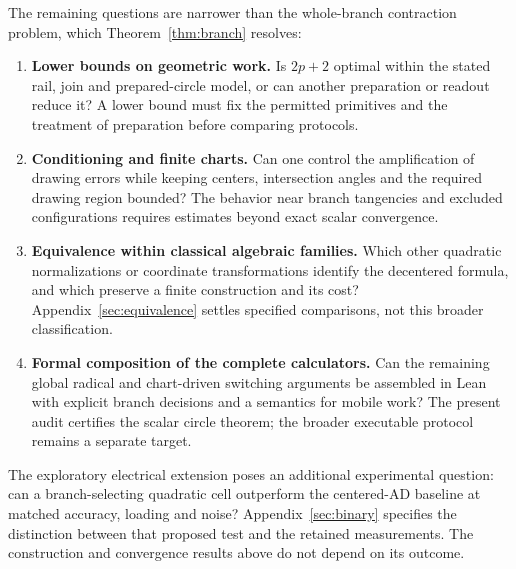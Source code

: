 \documentclass[11pt,a4paper]{article}
\begin{document}
The remaining questions are narrower than the whole-branch contraction problem, which Theorem~\ref{thm:branch} resolves:
\begin{enumerate}
\item \textbf{Lower bounds on geometric work.} Is $2p+2$ optimal within the stated rail, join and prepared-circle model, or can another preparation or readout reduce it? A lower bound must fix the permitted primitives and the treatment of preparation before comparing protocols.
\item \textbf{Conditioning and finite charts.} Can one control the amplification of drawing errors while keeping centers, intersection angles and the required drawing region bounded? The behavior near branch tangencies and excluded configurations requires estimates beyond exact scalar convergence.
\item \textbf{Equivalence within classical algebraic families.} Which other quadratic normalizations or coordinate transformations identify the decentered formula, and which preserve a finite construction and its cost? Appendix~\ref{sec:equivalence} settles specified comparisons, not this broader classification.
\item \textbf{Formal composition of the complete calculators.} Can the remaining global radical and chart-driven switching arguments be assembled in Lean with explicit branch decisions and a semantics for mobile work? The present audit certifies the scalar circle theorem; the broader executable protocol remains a separate target.
\end{enumerate}

The exploratory electrical extension poses an additional experimental question: can a branch-selecting quadratic cell outperform the centered-AD baseline at matched accuracy, loading and noise? Appendix~\ref{sec:binary} specifies the distinction between that proposed test and the retained measurements. The construction and convergence results above do not depend on its outcome.

\clearpage
\appendix
\end{document}
